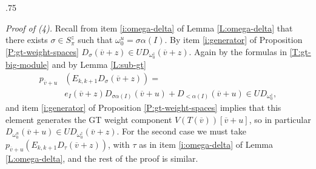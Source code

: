 \documentclass[11pt,fleqn]{amsart}
\makeatletter
\renewcommand\proofname{Proof}
\renewenvironment{proof}[1][\textit{\proofname}]{\par
 \pushQED{\qed}%
 \normalfont \topsep.75\paraskip\relax
 \trivlist
 \item[\hskip\labelsep
 \itshape
 #1\@addpunct{.}]\ignorespaces
}{%
 \popQED\endtrivlist\@endpefalse
}
\newcounter{para}[section]
\newcommand\vv{\overline{v}}
\makeatother
\begin{document}
\begin{proof}
\emph{Proof of (4).} Recall from item \ref{i:omega-delta} of Lemma
\ref{L:omega-delta} that there exists $\sigma \in S_\pi^z$ such that 
$\omega_0^u = \sigma\alpha(I)$. By item \ref{i:generator} of Proposition 
\ref{P:gt-weight-spaces} $D_\sigma(\vv + z) \in U D_{\omega_0^z}(\vv + z)$.
Again by the formulas in \ref{T:gt-big-module} and by Lemma \ref{L:sub-gt} 
\begin{align*}
p_{\vv+u}&(E_{k,k+1} D_\sigma(\vv + z)) =\\
	&e_I(\vv + z) D_{\sigma\alpha(I)}(\vv + u) + D_{<\alpha(I)}(\vv + u)
	\in U D_{\omega_0^z},
\end{align*}
and item \ref{i:generator} of Proposition \ref{P:gt-weight-spaces} implies
that this element generates the GT weight component $V(T(\vv))[\vv + u]$, so 
in particular $D_{\omega_0^u}(\vv + u) \in U D_{\omega_0^z}(\vv + z)$. For the 
second case we must take $p_{\vv+u}(E_{k,k+1} D_\tau(\vv + z))$, with 
$\tau$ as in item \ref{i:omega-delta} of Lemma \ref{L:omega-delta}, and the 
rest of the proof is similar.
\end{proof}
\end{document}

